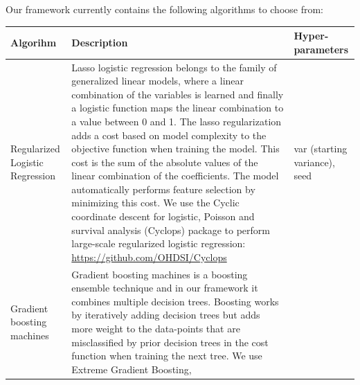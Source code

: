 \documentclass[]{book}
\begin{document}
Our framework currently contains the following algorithms to choose
from:

\begin{longtable}[]{@{}lll@{}}
\toprule
\begin{minipage}[b]{0.12\columnwidth}\raggedright\strut
Algorihm\strut
\end{minipage} & \begin{minipage}[b]{0.55\columnwidth}\raggedright\strut
Description\strut
\end{minipage} & \begin{minipage}[b]{0.25\columnwidth}\raggedright\strut
Hyper-parameters\strut
\end{minipage}\tabularnewline
\midrule
\endhead
\begin{minipage}[t]{0.12\columnwidth}\raggedright\strut
Regularized Logistic Regression\strut
\end{minipage} & \begin{minipage}[t]{0.55\columnwidth}\raggedright\strut
Lasso logistic regression belongs to the family of generalized linear
models, where a linear combination of the variables is learned and
finally a logistic function maps the linear combination to a value
between 0 and 1. The lasso regularization adds a cost based on model
complexity to the objective function when training the model. This cost
is the sum of the absolute values of the linear combination of the
coefficients. The model automatically performs feature selection by
minimizing this cost. We use the Cyclic coordinate descent for logistic,
Poisson and survival analysis (Cyclops) package to perform large-scale
regularized logistic regression:
\url{https://github.com/OHDSI/Cyclops}\strut
\end{minipage} & \begin{minipage}[t]{0.25\columnwidth}\raggedright\strut
var (starting variance), seed\strut
\end{minipage}\tabularnewline
\begin{minipage}[t]{0.12\columnwidth}\raggedright\strut
Gradient boosting machines\strut
\end{minipage} & \begin{minipage}[t]{0.55\columnwidth}\raggedright\strut
Gradient boosting machines is a boosting ensemble technique and in our
framework it combines multiple decision trees. Boosting works by
iteratively adding decision trees but adds more weight to the
data-points that are misclassified by prior decision trees in the cost
function when training the next tree. We use Extreme Gradient Boosting,

\end{minipage}
\end{longtable}
\end{document}
